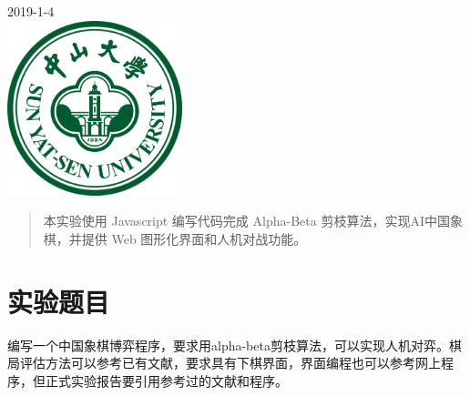 \begin{titlepage}


{\large 2019-1-4}\\[1cm] %


\includegraphics[width=2in]{logo.png}\\[0.5cm] %
 

\vfill %

\end{titlepage}


\begin{abstract}
    
本实验使用 Javascript 编写代码完成 Alpha-Beta 剪枝算法，实现AI中国象棋，并提供 Web 图形化界面和人机对战功能。

\end{abstract}

\section{实验题目}

编写一个中国象棋博弈程序，要求用alpha-beta剪枝算法，可以实现人机对弈。棋局评估方法可以参考已有文献，要求具有下棋界面，界面编程也可以参考网上程序，但正式实验报告要引用参考过的文献和程序。

